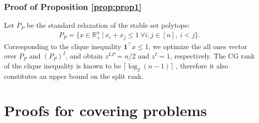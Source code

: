 \documentclass[11pt]{article}
\newcommand{\Z}{\mathbb{Z}}
\newcommand{\R}{\mathbb{R}}
\DeclareMathOperator{\rank}{rank}
\renewcommand{\S}{\mathcal{S}}
\newcommand{\ones}{\boldsymbol{1}}
\newtheorem{theorem}{Theorem}
\newcommand{\zLPc}{z^{LP}(c)}
\newcommand{\zIc}{z^{I}(c)}
\begin{document}
\subsubsection{Proof of Proposition \ref{prop:prop1}}
\label{subsubsec:4.5.4}
Let $P_P$ be the standard relaxation of the stable set polytope:
\begin{align*}
P_P = \{ x \in \R_+^{n} \,|\, x_i + x_j \le 1 \ \forall i,j \in [n], \ i < j\}.
\end{align*}
Corresponding to the clique inequality $\ones^\top x \le 1$, we optimize the all ones vector over $P_P$ and $(P_P)^I$, and obtain $z^{LP}=n/2$ and  $z^{I}=1$, respectively. %
The CG rank of the clique inequality is known to be $\lceil \log_2 (n-1) \rceil$ \cite{hartmann}, therefore it also constitutes an upper bound on the split rank.



\begin{comment}
\begin{theorem}
\label{thm:RankMultibranchProofForPacking}
Let $P_P$ be well-behaved and $k \in \Z_+, k \geq 1$. Then, 
\begin{eqnarray*}
\rank_{\S^k}(P_P) \geq \left\lceil\frac{\textup{log}_2\left( \frac{\zLPc}{\zIc}\right)}{\textup{log}_2(\min \{ 2^k,n \}+1)}\right\rceil, 
\end{eqnarray*}
for all $c \in \R_+^n$.
\end{theorem} 
\end{comment}


\section{Proofs for covering problems}
\label{sec:Covering}
\end{document}
